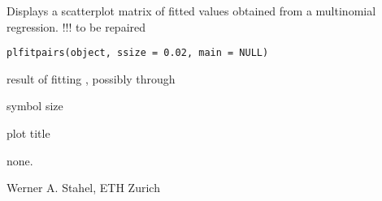 \documentclass{article}
\begin{document}
\begin{Description}\relax
Displays a scatterplot matrix of fitted values obtained from a
multinomial regression. !!! to be repaired
\end{Description}
\begin{Usage}
\begin{verbatim}
plfitpairs(object, ssize = 0.02, main = NULL)
\end{verbatim}
\end{Usage}
\begin{Arguments}
\begin{ldescription}
\item[\code{object}] result of fitting , possibly
through 
\item[\code{ssize}] symbol size
\item[\code{main}] plot title
\end{ldescription}
\end{Arguments}
\begin{Value}
none.
\end{Value}
\begin{Author}\relax
Werner A. Stahel, ETH Zurich
\end{Author}
\end{document}
